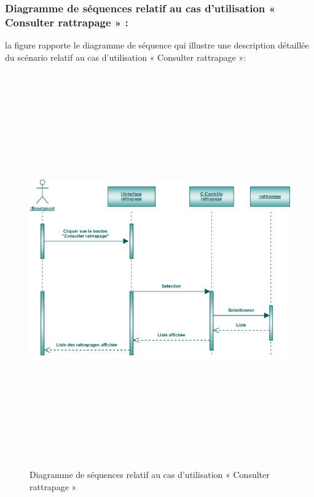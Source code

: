 \documentclass[12 pt ]{report}
\begin{document}
\subsubsection{Diagramme de séquences relatif au cas d’utilisation « Consulter rattrapage » :}
la figure   rapporte le diagramme de séquence qui illustre une description détaillée du scénario relatif au cas d’utilisation « Consulter rattrapage »: 
\begin{figure}[h]
 \begin{center}
\includegraphics[width= 18 cm ,height=  17cm]{sec_cons_rat.PNG}
\caption{Diagramme de séquences relatif au cas d’utilisation « Consulter rattrapage  »}

\end{center}
\end{figure}


\newpage
\clearpage
\end{document}
